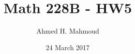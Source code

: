 \documentclass[12pt]{article}
\begin{document}
\title{Math 228B - HW5}
\author{Ahmed H. Mahmoud}
\date{24 March 2017} 

\maketitle

\newcommand{\cn}{Crank-Nicolson}
\newcommand{\lw}{Lax-Wendroff}
\newcommand{\bw}{Beam-Warming}


\newpage






\end{document}
